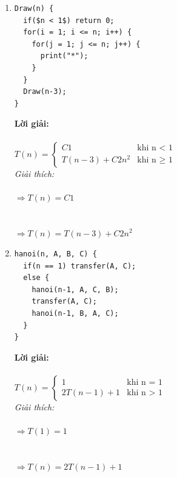 \documentclass[12pt, letterpaper]{article}
\begin{document}
\begin{enumerate}
	\item \begin{lstlisting}
Draw(n) {
  if($n < 1$) return 0;
  for(i = 1; i <= n; i++) {
    for(j = 1; j <= n; j++) {
      print("*");
    }
  }
  Draw(n-3);
}
	\end{lstlisting}
  \textbf{Lời giải:} \\ \\
  $T(n) =
  \begin{cases}
  C1 &\text{khi n < 1} \\
  T(n-3) + C2n^2 &\text{khi n $\geq$ 1}
  \end{cases}$ \\

  \textit{Giải thích:} \\
   \\
  $\Rightarrow T(n) = C1$ \\
   \\
   \\
  $\Rightarrow T(n) = T(n-3) + C2n^2$ \\

	\item \begin{lstlisting}
hanoi(n, A, B, C) {
  if(n == 1) transfer(A, C);
  else {
    hanoi(n-1, A, C, B);
    transfer(A, C);
    hanoi(n-1, B, A, C);
  }
}
  \end{lstlisting}

  \textbf{Lời giải:} \\ \\
  $T(n) =
  \begin{cases}
  1 &\text{khi n = 1} \\
  2T(n-1) + 1 &\text{khi n > 1}
  \end{cases}$ \\

  \textit{Giải thích:} \\
   \\
  $\Rightarrow T(1) = 1$ \\
   \\
   \\
  $\Rightarrow T(n) = 2T(n-1) + 1$ \\

\end{enumerate}
\end{document}
